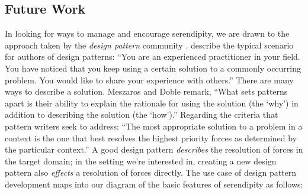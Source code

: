 \subsection{Future Work} \label{sec:futurework} \label{sec:hatching}

In looking for ways to manage and encourage serendipity, we are drawn
to the approach taken by the \emph{design pattern} community
\cite{alexander1999origins}.
 describe the typical scenario for authors of design
patterns: ``You are an experienced practitioner in your
field. You have noticed that you keep using a certain solution to a
commonly occurring problem. You would like to share your experience
with others.''  There are many ways to describe a solution.
Meszaros and Doble remark, ``What sets patterns apart is their
ability to explain the rationale for using the solution (the `why') in
addition to describing the solution (the `how').''  Regarding the
criteria that pattern writers seek to address: ``The most appropriate
solution to a problem in a context is the one that best resolves the
highest priority forces as determined by the particular context.'' 
%
%
A good design pattern \emph{describes} the resolution of forces in the
target domain; in the setting we're interested in, creating a new
design pattern also \emph{effects} a resolution of forces directly.
The use case of design pattern development maps into our diagram of
the basic features of serendipity as follows:



